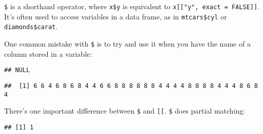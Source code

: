\texttt{\$} is a shorthand operator, where \texttt{x\$y} is equivalent
to \texttt{x{[}{[}"y",\ exact\ =\ FALSE{]}{]}}. It's often used to
access variables in a data frame, as in \texttt{mtcars\$cyl} or
\texttt{diamonds\$carat}. \indexc{\$} \indexc{[[}

One common mistake with \texttt{\$} is to try and use it when you have
the name of a column stored in a variable:

\begin{Shaded}
\begin{Highlighting}[]
\OperatorTok{$}
\end{Highlighting}
\end{Shaded}

\begin{verbatim}
## NULL
\end{verbatim}

\begin{Shaded}
\begin{Highlighting}[]
\CommentTok{# Instead use [[}
\end{Highlighting}
\end{Shaded}

\begin{verbatim}
##  [1] 6 6 4 6 8 6 8 4 4 6 6 8 8 8 8 8 8 4 4 4 4 8 8 8 8 4 4 4 8 6 8 4
\end{verbatim}

There's one important difference between \texttt{\$} and
\texttt{{[}{[}}. \texttt{\$} does partial matching:

\begin{Shaded}
\begin{Highlighting}[]
\StringTok{ }\NormalTok{(} \NormalTok{)}
\OperatorTok{$}
\end{Highlighting}
\end{Shaded}

\begin{verbatim}
## [1] 1
\end{verbatim}

\begin{Shaded}
\begin{Highlighting}[]
\NormalTok{x[[}\NormalTok{]]}
\end{Highlighting}
\end{Shaded}

